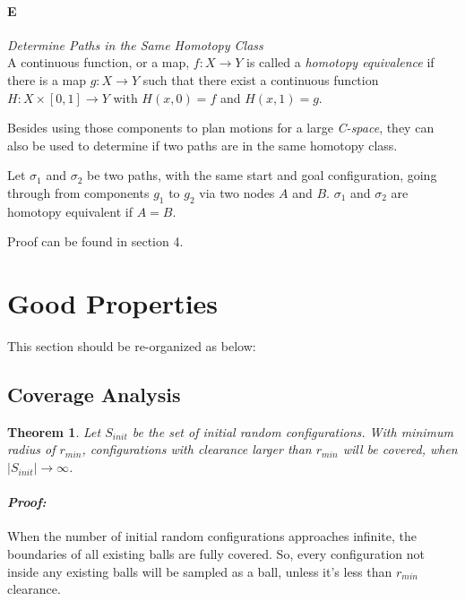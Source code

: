 \documentclass[11pt]{article}
\newtheorem{theorem}{Theorem}[section]
\begin{document}
\paragraph{E} \emph{Determine Paths in the Same Homotopy Class} \hfill \\
\indent A continuous function, or a map, $f: X \rightarrow Y$ is called a \emph{homotopy equivalence} if there is a map $g: X \rightarrow Y$ such that there exist a continuous function $H: X \times [0,1] \rightarrow Y$ with $H(x, 0) = f$ and $H(x,1) = g$.

\indent Besides using those components to plan motions for a large \emph{C-space}, they can also be used to determine if two paths are in the same homotopy class. 

\indent Let $\sigma_1$ and $\sigma_2$ be two paths, with the same start and goal configuration, going through from components $g_1$ to $g_2$ via two nodes $A$ and $B$. $\sigma_1$ and $\sigma_2$ are homotopy equivalent if $A = B$. 

\indent Proof can be found in section 4.

%
\section{Good Properties}\label{properties}
\indent\indent This section should be re-organized as below:
  \subsection{Coverage Analysis}
  \begin{theorem}
  Let $S_{init}$ be the set of initial random configurations. With minimum radius of $r_{min}$, configurations with clearance larger than $r_{min}$ will be covered, when $|S_{init}| \rightarrow \infty$.
  \end{theorem}
    
  \paragraph{\emph{Proof:}} 
  \indent When the number of initial random configurations approaches infinite, the boundaries of all existing balls are fully covered. So, every configuration not inside any existing balls will be sampled as a ball, unless it's less than $r_{min}$ clearance.\\
  
\end{document}
